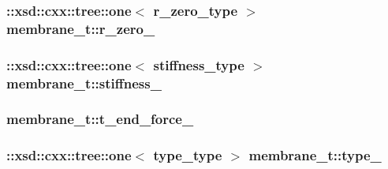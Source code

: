 \subsubsection[{\texorpdfstring{r\+\_\+zero\+\_\+}{r_zero_}}]{\setlength{\rightskip}{0pt plus 5cm}\+::xsd\+::cxx\+::tree\+::one$<$ {\bf r\+\_\+zero\+\_\+type} $>$ membrane\+\_\+t\+::r\+\_\+zero\+\_\+\hspace{0.3cm}{\ttfamily [protected]}}\hypertarget{classmembrane__t_adfd88126f59646de24e2f7cbd181cdc6}{}\label{classmembrane__t_adfd88126f59646de24e2f7cbd181cdc6}
\subsubsection[{\texorpdfstring{stiffness\+\_\+}{stiffness_}}]{\setlength{\rightskip}{0pt plus 5cm}\+::xsd\+::cxx\+::tree\+::one$<$ {\bf stiffness\+\_\+type} $>$ membrane\+\_\+t\+::stiffness\+\_\+\hspace{0.3cm}{\ttfamily [protected]}}\hypertarget{classmembrane__t_a7f034ef7743e351cf39eebc4e91609ca}{}\label{classmembrane__t_a7f034ef7743e351cf39eebc4e91609ca}
\subsubsection[{\texorpdfstring{t\+\_\+end\+\_\+force\+\_\+}{t_end_force_}}]{ membrane\+\_\+t\+::t\+\_\+end\+\_\+force\+\_\+\hspace{0.3cm}{\ttfamily [protected]}}\hypertarget{classmembrane__t_ac71b2beba26a9e7c9b69faf4da0de697}{}\label{classmembrane__t_ac71b2beba26a9e7c9b69faf4da0de697}
\subsubsection[{\texorpdfstring{type\+\_\+}{type_}}]{\setlength{\rightskip}{0pt plus 5cm}\+::xsd\+::cxx\+::tree\+::one$<$ {\bf type\+\_\+type} $>$ membrane\+\_\+t\+::type\+\_\+\hspace{0.3cm}{\ttfamily [protected]}}\hypertarget{classmembrane__t_ad8a6936861e18527605ef23e0fe44939}{}\label{classmembrane__t_ad8a6936861e18527605ef23e0fe44939}
